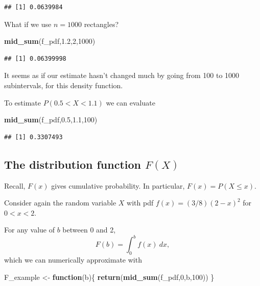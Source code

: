 \documentclass[
]{book}
\newenvironment{Shaded}{\begin{snugshade}}{\end{snugshade}}
\newcommand{\ControlFlowTok}[1]{\textcolor[rgb]{0.13,0.29,0.53}{\textbf{#1}}}
\newcommand{\DecValTok}[1]{\textcolor[rgb]{0.00,0.00,0.81}{#1}}
\newcommand{\FloatTok}[1]{\textcolor[rgb]{0.00,0.00,0.81}{#1}}
\newcommand{\FunctionTok}[1]{\textcolor[rgb]{0.13,0.29,0.53}{\textbf{#1}}}
\newcommand{\NormalTok}[1]{#1}
\newcommand{\OtherTok}[1]{\textcolor[rgb]{0.56,0.35,0.01}{#1}}
\theoremstyle{definition}
\theoremstyle{definition}
\theoremstyle{definition}
\theoremstyle{definition}
\theoremstyle{remark}
\begin{document}
\begin{verbatim}
## [1] 0.0639984
\end{verbatim}

What if we use \(n = 1000\) rectangles?

\begin{Shaded}
\begin{Highlighting}[]
\FunctionTok{mid\_sum}\NormalTok{(f\_pdf,}\FloatTok{1.2}\NormalTok{,}\DecValTok{2}\NormalTok{,}\DecValTok{1000}\NormalTok{)}
\end{Highlighting}
\end{Shaded}

\begin{verbatim}
## [1] 0.06399998
\end{verbatim}

It seems as if our estimate hasn't changed much by going from 100 to 1000 subintervals, for this density function.

To estimate \(P(0.5 < X < 1.1)\) we can evaluate

\begin{Shaded}
\begin{Highlighting}[]
\FunctionTok{mid\_sum}\NormalTok{(f\_pdf,}\FloatTok{0.5}\NormalTok{,}\FloatTok{1.1}\NormalTok{,}\DecValTok{100}\NormalTok{)}
\end{Highlighting}
\end{Shaded}

\begin{verbatim}
## [1] 0.3307493
\end{verbatim}

\subsection*{\texorpdfstring{The distribution function \(F(X)\)}{The distribution function F(X)}}\label{the-distribution-function-fx}

Recall, \(F(x)\) gives cumulative probability. In particular, \(F(x) = P(X \leq x)\).

Consider again the random variable \(X\) with pdf \(f(x) = (3/8)(2-x)^2\) for \(0 < x < 2\).

For any value of \(b\) between 0 and 2, \[F(b) = \int_0^b f(x)~dx,\]
which we can numerically approximate with

\begin{Shaded}
\begin{Highlighting}[]
\NormalTok{F\_example }\OtherTok{\textless{}{-}} \ControlFlowTok{function}\NormalTok{(b)\{}
  \FunctionTok{return}\NormalTok{(}\FunctionTok{mid\_sum}\NormalTok{(f\_pdf,}\DecValTok{0}\NormalTok{,b,}\DecValTok{100}\NormalTok{))}
\NormalTok{\}}
\end{Highlighting}
\end{Shaded}
\end{document}
